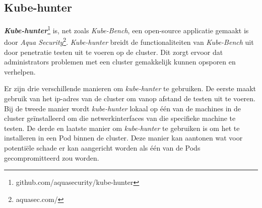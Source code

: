 \subsection{Kube-hunter} \label{hunter}

\textbf{\textit{Kube-hunter}}\footnote{github.com/aquasecurity/kube-hunter} is, net zoals \textit{Kube-Bench}, een open-source applicatie gemaakt is door \textit{Aqua Security}\footnote{aquasec.com/}. \textit{Kube-hunter} breidt de functionaliteiten van \textit{Kube-Bench} uit door penetratie testen uit te voeren op de cluster. Dit zorgt ervoor dat administrators problemen met een cluster gemakkelijk kunnen opsporen en verhelpen.

Er zijn drie verschillende manieren om \textit{kube-hunter} te gebruiken. De eerste maakt gebruik van het ip-adres van de cluster om vanop afstand de testen uit te voeren. Bij de tweede manier wordt \textit{kube-hunter} lokaal op één van de machines in de cluster geïnstalleerd om die netwerkinterfaces van die specifieke machine te testen. De derde en laatste manier om \textit{kube-hunter} te gebruiken is om het te installeren in een Pod binnen de cluster. Deze manier kan aantonen wat voor potentiële schade er kan aangericht worden als één van de Pods gecompromitteerd zou worden.